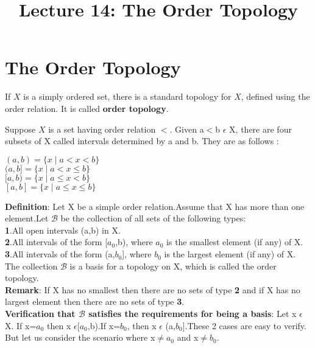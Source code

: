\documentclass[a4paper,english,12pt]{article}
\title{Lecture 14: The Order Topology}
\author{}
\begin{document}
\maketitle
\section{The Order Topology}
\begin{defn}
If $X$ is a simply ordered set, there is a standard topology for $X$, defined using the order relation. It is called \textbf{order topology}.
\end{defn}
\begin{defn} Suppose $X$ is a set having order relation $<$. Given a$<$b $\epsilon$ X, there are four subsets of X called intervals determined by a and b. They are as follows :\\
\begin{centering}
$(a,b)=\{x\mid a<x<b\}$\\
$(a,b]=\{x\mid a<x\leq b\}$\\
$[a,b)=\{x\mid a\leq x<b\}$\\
$[a,b]=\{x\mid a\leq x\leq b\}$\\
\end{centering}
\vspace{2mm}
{\bf Definition}: Let X be a simple order relation.Assume that X has more than one element.Let $\mathscr{B}$ be the collection of all sets of the following types:\\
\vspace{2mm}
{\bf 1}.All open intervals (a,b) in X.\\
{\bf 2}.All intervals of the form [$a_0$,b), where $a_0$ is the smallest element (if any) of X.\\
{\bf 3}.All intervals of the form (a,$b_0$], where $b_0$ is the largest element (if any) of X.\\
\vspace{2mm}
The collection $\mathscr{B}$ is a basis for a topology on X, which is called the order topology.\\
\vspace{1mm}
{\bf Remark}: If X has no smallest then there are no sets of type {\bf 2} and if X has no largest element then there are no sets of type {\bf 3}.\\
\vspace{1mm}
{\bf Verification that $\mathscr{B}$ satisfies the requirements for being a basis}: Let x $\epsilon$ X. If x=$a_0$ then x $\epsilon$[$a_0$,b).If x=$b_0$, then x $\epsilon$ (a,$b_0$].These 2 cases are easy to verify. But let us consider the scenario where x$\neq a_0$ and x$\neq b_0$.\\

\end{defn}
\end{document}
